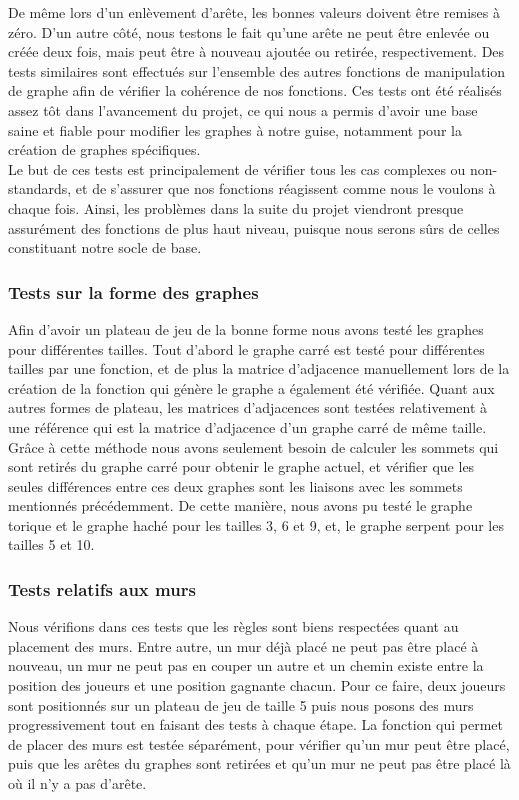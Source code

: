 \documentclass[a4paper]{article}
\begin{document}
De même lors d'un enlèvement d'arête, les bonnes valeurs doivent être remises à zéro. D'un autre côté, nous testons le fait qu'une arête ne peut être enlevée ou créée deux fois, mais peut être à nouveau ajoutée ou retirée, respectivement. Des tests similaires sont effectués sur l'ensemble des autres fonctions de manipulation de graphe afin de vérifier la cohérence de nos fonctions. Ces tests ont été réalisés assez tôt dans l'avancement du projet, ce qui nous a permis d'avoir une base saine et fiable pour modifier les graphes à notre guise, notamment pour la création de graphes spécifiques. \\

Le but de ces tests est principalement de vérifier tous les cas complexes ou non-standards, et de s'assurer que nos fonctions réagissent comme nous le voulons à chaque fois. Ainsi, les problèmes dans la suite du projet viendront presque assurément des fonctions de plus haut niveau, puisque nous serons sûrs de celles constituant notre socle de base. 

\subsubsection{Tests sur la forme des graphes}
Afin d'avoir un plateau de jeu de la bonne forme nous avons testé les graphes pour différentes tailles.
Tout d'abord le graphe carré est testé pour différentes tailles par une fonction, et de plus la matrice d'adjacence manuellement lors de la création de la fonction qui génère le graphe a également été vérifiée. Quant aux autres formes de plateau, les matrices d'adjacences sont testées relativement à une référence qui est la matrice d'adjacence d'un graphe carré de même taille. Grâce à cette méthode nous avons seulement besoin de calculer les sommets qui sont retirés du graphe carré pour obtenir le graphe actuel, et vérifier que les seules différences entre ces deux graphes sont les liaisons avec les sommets mentionnés précédemment. De cette manière, nous avons pu testé le graphe torique et le graphe haché pour les tailles 3, 6 et 9, et, le graphe serpent pour les tailles 5 et 10.

\subsubsection{Tests relatifs aux murs}
Nous vérifions dans ces tests que les règles sont biens respectées quant au placement des murs.
Entre autre, un mur déjà placé ne peut pas être placé à nouveau, un mur ne peut pas en couper un autre et un chemin existe entre la position des joueurs et une position gagnante chacun. Pour ce faire, deux joueurs sont positionnés sur un plateau de jeu de taille 5 puis nous posons des murs progressivement tout en faisant des tests à chaque étape. La fonction qui permet de placer des murs est testée séparément, pour vérifier qu'un mur peut être placé, puis que les arêtes du graphes sont retirées et qu'un mur ne peut pas être placé là où il n'y a pas d'arête.
\end{document}
